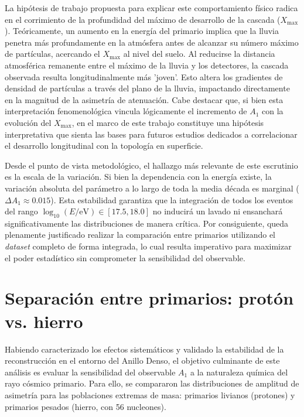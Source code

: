 La hipótesis de trabajo propuesta para explicar este comportamiento físico radica en el corrimiento de la profundidad del máximo de desarrollo de la cascada ($X_{\mathrm{max}}$). Teóricamente, un aumento en la energía del primario implica que la lluvia penetra más profundamente en la atmósfera antes de alcanzar su número máximo de partículas, acercando el $X_{\mathrm{max}}$ al nivel del suelo. Al reducirse la distancia atmosférica remanente entre el máximo de la lluvia y los detectores, la cascada observada resulta longitudinalmente más 'joven'. Esto altera los gradientes de densidad de partículas a través del plano de la lluvia, impactando directamente en la magnitud de la asimetría de atenuación. Cabe destacar que, si bien esta interpretación fenomenológica vincula lógicamente el incremento de $A_1$ con la evolución del $X_{\mathrm{max}}$, en el marco de este trabajo constituye una hipótesis interpretativa que sienta las bases para futuros estudios dedicados a correlacionar el desarrollo longitudinal con la topología en superficie.

Desde el punto de vista metodológico, el hallazgo más relevante de este escrutinio es la escala de la variación. Si bien la dependencia con la energía existe, la variación absoluta del parámetro a lo largo de toda la media década es marginal ($\Delta A_1 \approx 0.015$). Esta estabilidad garantiza que la integración de todos los eventos del rango $\log_{10}(E/\mathrm{eV}) \in [17.5, 18.0]$ no inducirá un lavado ni ensanchará significativamente las distribuciones de manera crítica. Por consiguiente, queda plenamente justificado realizar la comparación entre primarios utilizando el \textit{dataset} completo de forma integrada, lo cual resulta imperativo para maximizar el poder estadístico sin comprometer la sensibilidad del observable.

\section{Separación entre primarios: protón vs. hierro}
\label{sec:discriminacion_masa}

Habiendo caracterizado los efectos sistemáticos y validado la estabilidad de la reconstrucción en el entorno del Anillo Denso, el objetivo culminante de este análisis es evaluar la sensibilidad del observable $A_1$ a la naturaleza química del rayo cósmico primario. Para ello, se compararon las distribuciones de amplitud de asimetría para las poblaciones extremas de masa: primarios livianos (protones) y primarios pesados (hierro, con 56 nucleones). 

